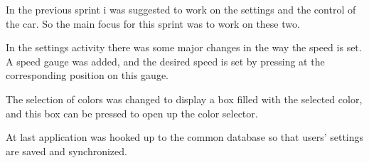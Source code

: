 In the previous sprint i was suggested to work on the settings and the control of the car.
So the main focus for this sprint was to work on these two.

In the settings activity there was some major changes in the way the speed is set.
A speed gauge was added, and the desired speed is set by pressing at the corresponding position on this gauge.

The selection of colors was changed to display a box filled with the selected color, and this box can be pressed to open up the color selector.


At last application was hooked up to the common database so that users' settings are saved and synchronized.